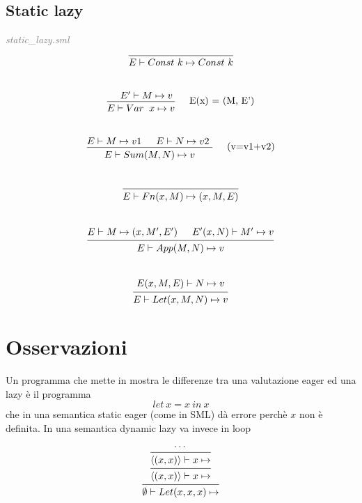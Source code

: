 \documentclass[a4paper]{article}
\begin{document}
	\subsection{Static lazy}
	\textit{\textcolor{gray}{static\_lazy.sml}} \\
	\[
		\begin{prooftree}
			\hypo{}
			\infer1[]{E \vdash Const \ k \mapsto Const \ k} 
		\end{prooftree}
	\]
	\\
	\[
		\begin{prooftree}
			\hypo{E' \vdash M \mapsto v }
			\infer1[\quad E(x) = (M, E')]{E \vdash Var &x \mapsto v}
		\end{prooftree}
	\]
	\\
	\[
		\begin{prooftree}
			\hypo{E \vdash M \mapsto v1}
			\hypo{E \vdash N \mapsto v2 }
			\infer2[\quad (v=v1+v2)]{E \vdash Sum(M, N) \mapsto v}
		\end{prooftree}
	\]
	\\
	\[
		\begin{prooftree}
			\hypo{}
			\infer1[]{E \vdash Fn(x, M) \mapsto (x, M, E)}
		\end{prooftree}
	\]
	\\
	\[
		\begin{prooftree}
			\hypo{E \vdash M \mapsto (x, M', E')}
			\hypo{E'(x, N) \vdash M' \mapsto v}
			\infer2[]{E \vdash App(M, N) \mapsto v}
		\end{prooftree}
	\]
	\\
	\[
		\begin{prooftree}
			\hypo{E(x, M, E) \vdash N \mapsto v}
			\infer1[]{E \vdash Let(x, M, N) \mapsto v}
		\end{prooftree}
	\]
	
	\section{Osservazioni}
	Un programma che mette in mostra le differenze tra una valutazione eager ed una lazy è il programma 
	\[ let \ x = x \ in \ x \]
	che in una semantica static eager (come in SML) dà errore perchè $x$ non è definita. In una semantica dynamic lazy va invece in loop

	\begin{figure}[ht]
	\[
		\begin{prooftree}
			\hypo{\cdots}
			\infer1[]{\langle (x,x) \rangle \vdash x \mapsto }
			\infer1[]{\langle (x,x) \rangle \vdash x \mapsto }
			\infer1[]{\emptyset \vdash Let(x,x,x) \mapsto }
		\end{prooftree}
	\]
	\end{figure}
\end{document}
